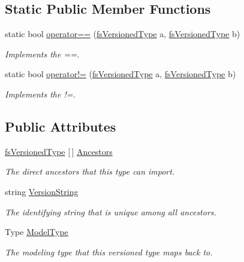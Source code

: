 \subsection*{Static Public Member Functions}
\begin{DoxyCompactItemize}
\item 
static bool \hyperlink{struct_full_serializer_1_1_internal_1_1fs_versioned_type_adca4814331ac9692e9e275a0f800343b}{operator==} (\hyperlink{struct_full_serializer_1_1_internal_1_1fs_versioned_type}{fs\+Versioned\+Type} a, \hyperlink{struct_full_serializer_1_1_internal_1_1fs_versioned_type}{fs\+Versioned\+Type} b)
\begin{DoxyCompactList}\small\item\em Implements the ==. \end{DoxyCompactList}\item 
static bool \hyperlink{struct_full_serializer_1_1_internal_1_1fs_versioned_type_a2ed1972bbf8e0181d549dc5c258549d1}{operator!=} (\hyperlink{struct_full_serializer_1_1_internal_1_1fs_versioned_type}{fs\+Versioned\+Type} a, \hyperlink{struct_full_serializer_1_1_internal_1_1fs_versioned_type}{fs\+Versioned\+Type} b)
\begin{DoxyCompactList}\small\item\em Implements the !=. \end{DoxyCompactList}\end{DoxyCompactItemize}
\subsection*{Public Attributes}
\begin{DoxyCompactItemize}
\item 
\hyperlink{struct_full_serializer_1_1_internal_1_1fs_versioned_type}{fs\+Versioned\+Type} \mbox{[}$\,$\mbox{]} \hyperlink{struct_full_serializer_1_1_internal_1_1fs_versioned_type_a39df96581297b4b9d9fbadfdeeaea33d}{Ancestors}
\begin{DoxyCompactList}\small\item\em The direct ancestors that this type can import. \end{DoxyCompactList}\item 
string \hyperlink{struct_full_serializer_1_1_internal_1_1fs_versioned_type_a979556013923bbb22b6ffe86840fca79}{Version\+String}
\begin{DoxyCompactList}\small\item\em The identifying string that is unique among all ancestors. \end{DoxyCompactList}\item 
Type \hyperlink{struct_full_serializer_1_1_internal_1_1fs_versioned_type_a7b9f9eb4f88ca3f145174415e92dc3f2}{Model\+Type}
\begin{DoxyCompactList}\small\item\em The modeling type that this versioned type maps back to. \end{DoxyCompactList}\end{DoxyCompactItemize}


